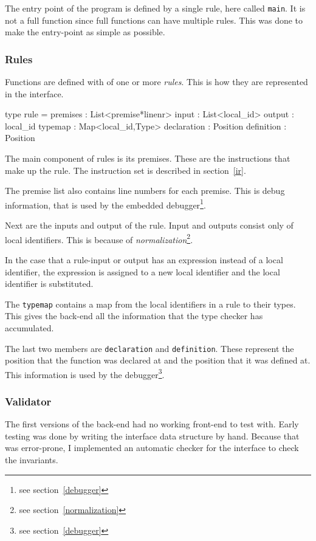 The entry point of the program is defined by a single rule, here called \verb|main|.
It is not a full function since full functions can have multiple rules.
This was done to make the entry-point as simple as possible.

\subsubsection{Rules}

Functions are defined with of one or more \textit{rules}.
This is how they are represented in the interface.

\begin{FS}
type rule = {
  premises    : List<premise*linenr>
  input       : List<local_id>
  output      : local_id
  typemap     : Map<local_id,Type>
  declaration : Position
  definition  : Position
}
\end{FS}

The main component of rules is its premises.
These are the instructions that make up the rule.
The instruction set is described in section~\ref{ir}.

The premise list also contains line numbers for each premise.
This is debug information, that is used by the embedded debugger\footnote{see section~\ref{debugger}}.

Next are the inputs and output of the rule.
Input and outputs consist only of local identifiers.
This is because of \textit{normalization}\footnote{see section~\ref{normalization}}.

In the case that a rule-input or output has an expression instead of a local identifier,
 the expression is assigned to a new local identifier and the local identifier is substituted.

The \texttt{typemap} contains a map from the local identifiers in a rule to their types.
This gives the back-end all the information that the type checker has accumulated.

The last two members are \verb|declaration| and \verb|definition|.
These represent the position that the function was declared at and the position that it was defined at.
This information is used by the debugger\footnote{see section~\ref{debugger}}.

\subsubsection{Validator}
The first versions of the back-end had no working front-end to test with.
Early testing was done by writing the interface data structure by hand.
Because that was error-prone, I implemented an automatic checker for the interface to check the invariants.

